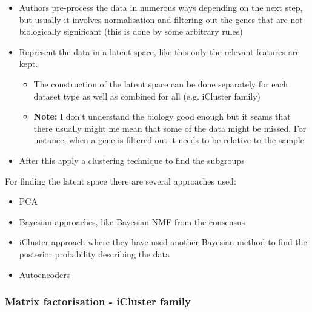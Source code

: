 \begin{itemize}
    \item Authors pre-process the data in numerous ways depending on the next step, but usually it involves normalisation and filtering out the genes that are not biologically significant (this is done by some arbitrary rules)
    
    \item Represent the data in a latent space, like this only the relevant features are kept. 
    \begin{itemize}
        \item The construction of the latent space can be done separately for each dataset type as well as combined for all (e.g. iCluster family)
        \item \textbf{Note:} I don't understand the biology good enough but it seams that there usually might me mean that some of the data might be missed. For instance, when a gene is filtered out it needs to be relative to the sample
    \end{itemize}
    
    \item After this apply a clustering technique to find the subgroups
\end{itemize}

For finding the latent space there are several approaches used:

\begin{itemize}
    \item PCA
    \item Bayesian approaches, like Bayesian NMF from the consensus 
    \item iCluster approach where they have used another Bayesian method to find the posterior probability describing the data
    \item Autoencoders
    
\end{itemize}


\newpage

\subsubsection{Matrix factorisation - iCluster family}


